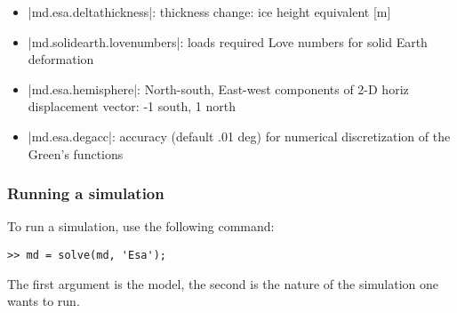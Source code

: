 \begin{itemize}
	\item \lstinlinebg|md.esa.deltathickness|: thickness change: ice height equivalent [m]
	\item \lstinlinebg|md.solidearth.lovenumbers|: loads required Love numbers for solid Earth deformation
	\item \lstinlinebg|md.esa.hemisphere|: North-south, East-west components of 2-D horiz displacement vector: -1 south, 1 north
	\item \lstinlinebg|md.esa.degacc|: accuracy (default .01 deg) for numerical discretization of the Green's functions
\end{itemize}

\subsubsection{Running a simulation}
To run a simulation, use the following command:
\begin{lstlisting}
>> md = solve(md, 'Esa');
\end{lstlisting}
The first argument is the model, the second is the nature of the simulation one wants to run.

\clearpage %
